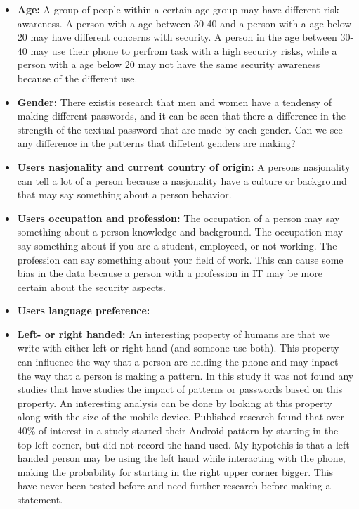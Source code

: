       \begin{itemize}
        \item {\bf Age:} A group of people within a certain age group may have different risk awareness. A person with a age between 30-40 and a person with a age below 20 may have different concerns with security. A person in the age between 30-40 may use their phone to perfrom task with a high security risks, while a person with a age below 20 may not have the same security awareness because of the different use. 
        \item {\bf Gender:} There existis research that men and women have a tendensy of making different passwords, and it can be seen that there a difference in the strength of the textual password that are made by each gender. Can we see any difference in the patterns that diffetent genders are making?
        \item {\bf Users nasjonality and current country of origin:} A persons nasjonality can tell a lot of a person because a nasjonality have a culture or background that may say something about a person behavior. 
        \item {\bf Users occupation and profession:} The occupation of a person may say something about a person knowledge and background. The occupation may say something about if you are a student, employeed, or not working. The profession can say something about your field of work. This can cause some bias in the data because a person with a profession in IT may be more certain about the security aspects.
        \item {\bf Users language preference:}
        \item {\bf Left- or right handed:} An interesting property of humans are that we write with either left or right hand (and someone use both). This property can influence the way that a person are helding the phone and may inpact the way that a person is making a pattern. In this study it was not found any studies that have studies the impact of patterns or passwords based on this property. An interesting analysis can be done by looking at this property along with the size of the mobile device. Published research \cite{Uellenbeck} found that over 40\% of interest in a study started their Android pattern by starting in the top left corner, but did not record the hand used. My hypotehis is that a left handed person may be using the left hand while interacting with the phone, making the probability for starting in the right upper corner bigger. This have never been tested before and need further research before making a statement. 

\end{itemize}
